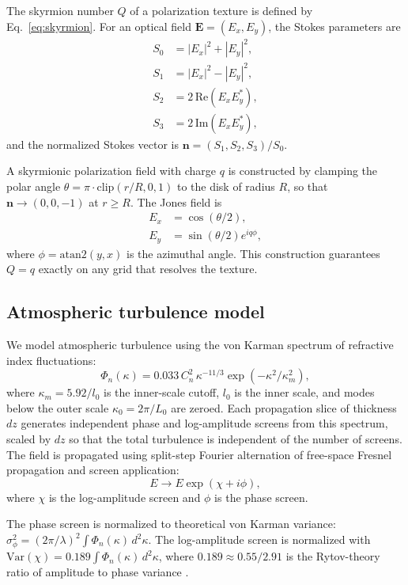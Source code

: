 \documentclass[11pt]{article}
\begin{document}
The skyrmion number $Q$ of a polarization texture is defined by
Eq.~\eqref{eq:skyrmion}. For an optical field $\mathbf{E} = (E_x, E_y)$,
the Stokes parameters are
\begin{align}
S_0 &= |E_x|^2 + |E_y|^2,\\
S_1 &= |E_x|^2 - |E_y|^2,\\
S_2 &= 2\,\mathrm{Re}(E_x E_y^*),\\
S_3 &= 2\,\mathrm{Im}(E_x E_y^*),
\end{align}
and the normalized Stokes vector is $\mathbf{n} = (S_1, S_2, S_3)/S_0$.

A skyrmionic polarization field with charge $q$ is constructed by clamping
the polar angle $\theta = \pi \cdot \mathrm{clip}(r/R, 0, 1)$ to the disk
of radius $R$, so that $\mathbf{n} \to (0, 0, -1)$ at $r \ge R$. The
Jones field is
\begin{align}
E_x &= \cos(\theta/2),\\
E_y &= \sin(\theta/2) e^{i q \phi},
\label{eq:jones}
\end{align}
where $\phi = \mathrm{atan2}(y, x)$ is the azimuthal angle. This
construction guarantees $Q = q$ exactly on any grid that resolves the
texture.

\subsection{Atmospheric turbulence model}

We model atmospheric turbulence using the von Karman spectrum of refractive
index fluctuations:
\begin{equation}
\Phi_n(\kappa) = 0.033\, C_n^2\, \kappa^{-11/3} \exp(-\kappa^2/\kappa_m^2),
\label{eq:vonkarman}
\end{equation}
where $\kappa_m = 5.92/l_0$ is the inner-scale cutoff, $l_0$ is the inner
scale, and modes below the outer scale $\kappa_0 = 2\pi/L_0$ are zeroed.
Each propagation slice of thickness $dz$ generates independent phase and
log-amplitude screens from this spectrum, scaled by $dz$ so that the total
turbulence is independent of the number of screens. The field is propagated
using split-step Fourier alternation of free-space Fresnel propagation and
screen application:
\begin{equation}
E \to E \exp(\chi + i\phi),
\label{eq:screens}
\end{equation}
where $\chi$ is the log-amplitude screen and $\phi$ is the phase screen.

The phase screen is normalized to theoretical von Karman variance:
$\sigma_\phi^2 = (2\pi/\lambda)^2 \int \Phi_n(\kappa) \, d^2\kappa$.
The log-amplitude screen is normalized with
$\mathrm{Var}(\chi) = 0.189 \int \Phi_n(\kappa) \, d^2\kappa$,
where $0.189 \approx 0.55/2.91$ is the Rytov-theory ratio of amplitude to
phase variance \cite{tatarskii1971wave}.
\end{document}
